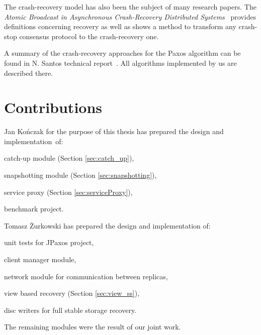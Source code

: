 The crash-recovery model has also been the subject of many research papers. \linebreak The \textit{Atomic Broadcast in Asynchronous Crash-Recovery Distributed Systems}~\cite{rodriguez2000atomic} provides definitions concerning recovery as well as shows a method to transform any crash-stop consensus protocol to the crash-recovery one.

A summary of the crash-recovery approaches for the Paxos algorithm can be found in N. Santos technical report~\cite{Nun10}. All algorithms implemented by us are described there.

\section{Contributions}

Jan Kończak for the purpose of this thesis has prepared the design and implementation~of:
\begin{tightList}
  \item[\textbullet] catch-up module (Section \ref{sec:catch_up}),
  \item[\textbullet] snapshotting module (Section \ref{sec:snapshotting}),
  \item[\textbullet] service proxy  (Section \ref{sec:serviceProxy}),
  \item[\textbullet] benchmark project.
\end{tightList}

\noindent Tomasz Żurkowski has prepared the design and implementation of:
\begin{tightList}
  \item[\textbullet] unit tests for JPaxos project,
  \item[\textbullet] client manager module, 
  \item[\textbullet] network module for communication between replicas,
  \item[\textbullet] view based recovery (Section \ref{sec:view_ss}),
  \item[\textbullet] disc writers for full stable storage recovery.
\end{tightList}

\noindent The remaining modules were the result of our joint work.
